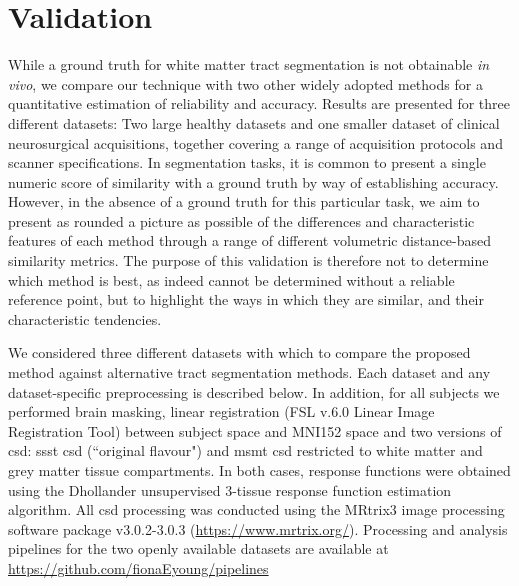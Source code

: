 \section{Validation}



While a ground truth for white matter tract segmentation is not obtainable \textit{in vivo}, we compare our technique with two other widely adopted methods for a quantitative estimation of reliability and accuracy.
Results are presented for three different datasets: Two large healthy datasets and one smaller dataset of clinical neurosurgical acquisitions, together covering a range of acquisition protocols and scanner specifications.
In segmentation tasks, it is common to present a single numeric score of similarity with a ground truth by way of establishing accuracy.
However, in the absence of a ground truth for this particular task, we aim to present as rounded a picture as possible of the differences and characteristic features of each method through a range of different volumetric distance-based similarity metrics.
The purpose of this validation is therefore not to determine which method is best, as indeed cannot be determined without a reliable reference point, but to highlight the ways in which they are similar, and their characteristic tendencies.

We considered three different datasets with which to compare the proposed method against alternative tract segmentation methods.
Each dataset and any dataset-specific preprocessing is described below. 
In addition, for all subjects we performed brain masking,\autocite{Tournier2019} linear registration\autocite{Jenkinson2001,Jenkinson2002} (FSL v.6.0 Linear Image Registration Tool) between subject space and MNI152\autocite{Fonov2011} space and two versions of \gls{csd}: \gls{ssst} \gls{csd} (``original flavour")\autocite{Tournier2007,Tournier2019} and \gls{msmt} \gls{csd}\autocite{Jeurissen2014} restricted to white matter and grey matter tissue compartments.
In both cases, response functions were obtained using the Dhollander unsupervised 3-tissue response function estimation algorithm.\autocite{Dhollander2016,Dhollander2019}
All \gls{csd} processing was conducted using the MRtrix3 image processing software package v3.0.2-3.0.3 (\url{https://www.mrtrix.org/}).\autocite{Tournier2019}
Processing and analysis pipelines for the two openly available datasets are available at \url{https://github.com/fionaEyoung/pipelines}

